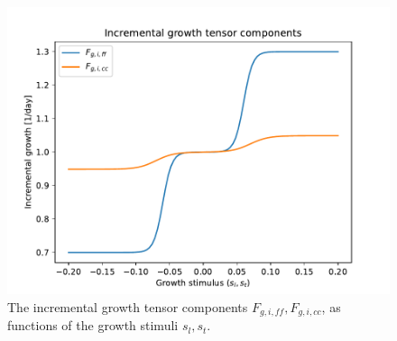 \documentclass[a4paper,10pt]{article}
\begin{document}
\begin{figure}
  \centerline{
    \includegraphics{figs/incr_growth_tensor}
  }
\caption{The incremental growth tensor components $F_{g,i,ff}, F_{g,i,cc}$, as functions of the growth stimuli $s_l, s_t$.} 
\label{fig:incr_growth_tensors}
\end{figure}
\end{document}
